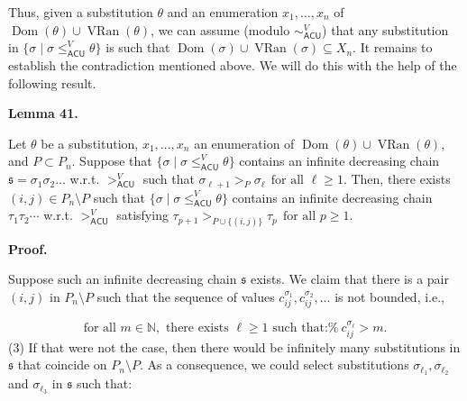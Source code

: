 \documentclass[10pt,a4paper]{amsart}
\begin{document}
 
Thus, given a substitution $\theta$ and an enumeration $x_{1},\ldots,x_{n}$ of $\operatorname{Dom}(\theta)\cup\operatorname{VRan}(\theta)$, we can assume (modulo $\sim_{\mathsf{ACU}}^{V}$) that any substitution in $\{\sigma\mid\sigma\leq_{\mathsf{ACU}}^{V}\theta\}$ is such that $\operatorname{Dom}(\sigma)\cup\operatorname{VRan}(\sigma)\subseteq X_{n}$. It remains to establish the contradiction mentioned above. We will do this with the help of the following result.\par
 
 
 
\par\medskip\noindent\textbf{Lemma 41.}\par
 
 
Let $\theta$ be a substitution, $x_{1},\ldots,x_{n}$ an enumeration of $\operatorname{Dom}(\theta)\cup\operatorname{VRan}(\theta)$, and $P\subset P_{n}$. Suppose that $\{\sigma\mid\sigma\leq_{\mathsf{ACU}}^{V}\theta\}$ contains an infinite decreasing chain $\mathfrak{s}=\sigma_{1}\sigma_{2}\ldots$ w.r.t. $>_{\mathsf{ACU}}^{V}$ such that $\sigma_{\ell+1}>_{P}\sigma_{\ell}\ \ \mbox{for all }\ell\geq 1.$ Then, there exists $(i,j)\in P_{n}\setminus P$ such that $\{\sigma\mid\sigma\leq_{\mathsf{ACU}}^{V}\theta\}$ contains an infinite decreasing chain $\tau_{1}\tau_{2}\cdots$ w.r.t. $>_{\mathsf{ACU}}^{V}$ satisfying $\tau_{p+1}>_{P\cup\{(i,j)\}}\tau_{p}\ \ \mbox{for all }p\geq 1.$\par
 
 
 
 
 
\par\medskip\noindent\textbf{Proof.}\par
 
 
Suppose such an infinite decreasing chain $\mathfrak{s}$ exists. We claim that there is a pair $(i,j)$ in $P_{n}\setminus P$ such that the sequence of values $c^{\sigma_{1}}_{ij},c^{\sigma_{2}}_{ij},\ldots$ is not bounded, i.e.,\par
    \[\text{for all }m\in\mathbb{N},\text{ there exists }\ell\geq 1\text{ such that:%
}\ c^{\sigma_{\ell}}_{ij}>m.\]  (3)   
If that were not the case, then there would be infinitely many substitutions in $\mathfrak{s}$ that coincide on $P_{n}\setminus P$. As a consequence, we could select substitutions $\sigma_{\ell_{1}},\sigma_{\ell_{2}}$ and $\sigma_{\ell_{3}}$ in $\mathfrak{s}$ such that:\par
  
\end{document}
